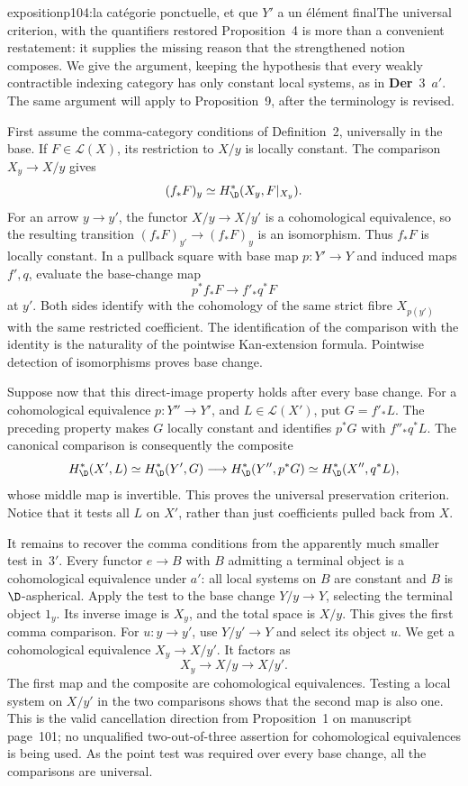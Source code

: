 \begin{dcomment}{exposition}{p104:la catégorie ponctuelle, et que $Y'$ a un élément final}{The universal criterion, with the quantifiers restored}
Proposition~4 is more than a convenient restatement: it supplies the missing reason that the strengthened notion composes. We give the argument, keeping the hypothesis that every weakly contractible indexing category has only constant local systems, as in \textbf{Der}~3~$a'$. The same argument will apply to Proposition~9, after the terminology is revised.

First assume the comma-category conditions of Definition~2, universally in the base. If $F\in\mathcal L(X)$, its restriction to $X/y$ is locally constant. The comparison $X_y\to X/y$ gives
\[
 (f_*F)_y\simeq H^*_{\D}(X_y,F|_{X_y}).
\]
For an arrow $y\to y'$, the functor $X/y\to X/y'$ is a cohomological equivalence, so the resulting transition $(f_*F)_{y'}\to(f_*F)_y$ is an isomorphism. Thus $f_*F$ is locally constant. In a pullback square with base map $p:Y'\to Y$ and induced maps $f',q$, evaluate the base-change map
\[
 p^*f_*F\longrightarrow f'_*q^*F
\]
at $y'$. Both sides identify with the cohomology of the same strict fibre $X_{p(y')}$ with the same restricted coefficient. The identification of the comparison with the identity is the naturality of the pointwise Kan-extension formula. Pointwise detection of isomorphisms proves base change.

Suppose now that this direct-image property holds after every base change. For a cohomological equivalence $p:Y''\to Y'$, and $L\in\mathcal L(X')$, put $G=f'_*L$. The preceding property makes $G$ locally constant and identifies $p^*G$ with $f''_*q^*L$. The canonical comparison is consequently the composite
\[
 H^*_{\D}(X',L)\simeq H^*_{\D}(Y',G)
 \longrightarrow H^*_{\D}(Y'',p^*G)
 \simeq H^*_{\D}(X'',q^*L),
\]
whose middle map is invertible. This proves the universal preservation criterion. Notice that it tests all $L$ on $X'$, rather than just coefficients pulled back from $X$.

It remains to recover the comma conditions from the apparently much smaller test in~$3'$. Every functor $e\to B$ with $B$ admitting a terminal object is a cohomological equivalence under $a'$: all local systems on $B$ are constant and $B$ is $\D$-aspherical. Apply the test to the base change $Y/y\to Y$, selecting the terminal object $1_y$. Its inverse image is $X_y$, and the total space is $X/y$. This gives the first comma comparison. For $u:y\to y'$, use $Y/y'\to Y$ and select its object $u$. We get a cohomological equivalence $X_y\to X/y'$. It factors as
\[
 X_y\longrightarrow X/y\longrightarrow X/y'.
\]
The first map and the composite are cohomological equivalences. Testing a local system on $X/y'$ in the two comparisons shows that the second map is also one. This is the valid cancellation direction from Proposition~1 on manuscript page~101; no unqualified two-out-of-three assertion for cohomological equivalences is being used. As the point test was required over every base change, all the comparisons are universal.


\end{dcomment}
